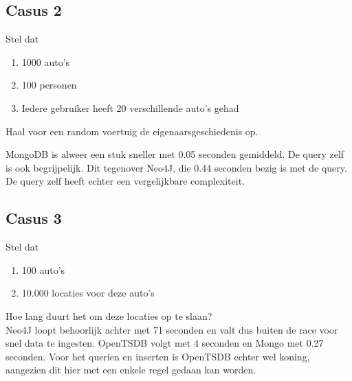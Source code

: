 \subsection{Casus 2}

Stel dat

\begin{enumerate}
	\item 1000 auto's
	\item 100 personen
	\item Iedere gebruiker heeft 20 verschillende auto's gehad
\end{enumerate}

Haal voor een random voertuig de eigenaarsgeschiedenis op.

MongoDB is alweer een stuk sneller met 0.05 seconden gemiddeld. De query zelf is ook begrijpelijk. Dit tegenover Neo4J, die 0.44 seconden bezig is met de query. De query zelf heeft echter een vergelijkbare complexiteit.

\subsection{Casus 3}

Stel dat

\begin{enumerate}
	\item 100 auto's
	\item 10.000 locaties voor deze auto's
\end{enumerate}

Hoe lang duurt het om deze locaties op te slaan? \\

Neo4J loopt behoorlijk achter met 71 seconden en valt dus buiten de race voor snel data te ingesten. OpenTSDB volgt met 4 seconden en Mongo met 0.27 seconden. Voor het querien en inserten is OpenTSDB echter wel koning, aangezien dit hier met een enkele regel gedaan kan worden.